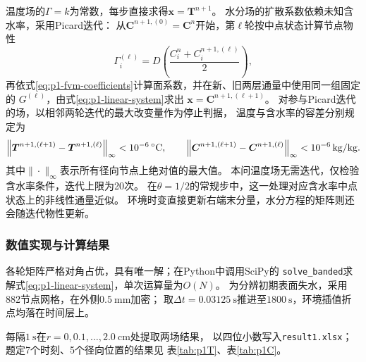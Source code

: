 温度场的$\Gamma=k$为常数，每步直接求得$\boldsymbol x=\boldsymbol T^{n+1}$。
水分场的扩散系数依赖未知含水率，采用Picard迭代：
从$\boldsymbol C^{n+1,(0)}=\boldsymbol C^n$开始，第$\ell$轮按中点状态计算节点物性
\begin{equation}
  \Gamma_i^{(\ell)}
  =D\!\left(\frac{C_i^n+C_i^{n+1,(\ell)}}{2}\right),
  \label{eq:p1-midpoint-picard}
\end{equation}
再依式\eqref{eq:p1-fvm-coefficients}计算面系数，并在新、旧两层通量中使用同一组固定的
$G^{(\ell)}$，由式\eqref{eq:p1-linear-system}求出
$\boldsymbol x=\boldsymbol C^{n+1,(\ell+1)}$。
对参与Picard迭代的场，以相邻两轮迭代的最大改变量作为停止判据，
温度与含水率的容差分别规定为
\begin{equation}
  \left\|\boldsymbol T^{n+1,(\ell+1)}
       -\boldsymbol T^{n+1,(\ell)}\right\|_\infty
       <10^{-6}\,{}^{\circ}\mathrm{C},\qquad
  \left\|\boldsymbol C^{n+1,(\ell+1)}
       -\boldsymbol C^{n+1,(\ell)}\right\|_\infty
       <10^{-6}\,\mathrm{kg/kg}.
  \label{eq:picard-tolerance}
\end{equation}
其中$\|\cdot\|_\infty$表示所有径向节点上绝对值的最大值。
本问温度场无需迭代，仅检验含水率条件，迭代上限为20次。
在$\theta=1/2$的常规步中，这一处理对应含水率中点状态上的非线性通量近似。
环境时变直接更新右端末分量，水分方程的矩阵则还会随迭代物性更新。

\subsubsection{数值实现与计算结果}

各轮矩阵严格对角占优，具有唯一解\cite{num}；在Python中调用SciPy的
\texttt{solve\_banded}求解式\eqref{eq:p1-linear-system}，单次运算量为$O(N)$。
为分辨初期表面失水，采用882节点网格，在外侧$0.5\ \mathrm{mm}$加密；
取$\Delta t=0.03125\ \mathrm{s}$推进至$1800\ \mathrm{s}$，环境插值折点均落在时间层上。

每隔$1\ \mathrm{s}$在$r=0,0.1,\ldots,2.0\ \mathrm{cm}$处提取两场结果，
以四位小数写入\texttt{result1.xlsx}；题定7个时刻、5个径向位置的结果见
表\ref{tab:p1T}、表\ref{tab:p1C}。

